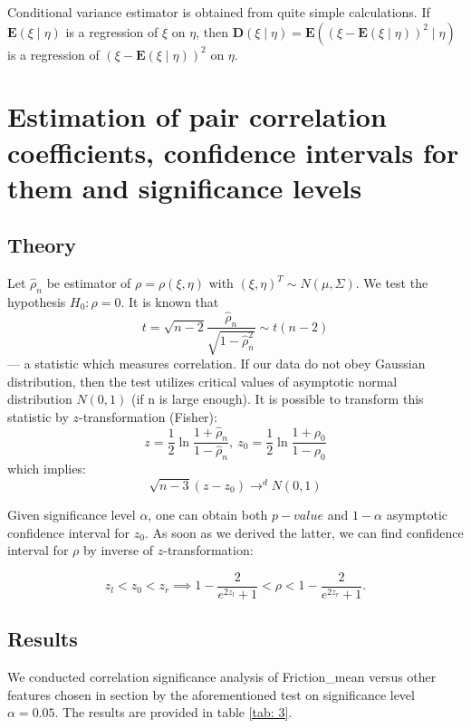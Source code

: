 \documentclass[12pt, bachelor, substylefile = algo_title.rtx]{disser}
\theoremstyle{definition}
\begin{document}
Conditional variance estimator is obtained from quite simple calculations. If $\mathbf{E}(\xi \mid \eta)$ is a regression of $\xi$ on $\eta$, then $\mathbf{D}(\xi \mid \eta) = \mathbf{E}((\xi - \mathbf{E}(\xi \mid \eta))^2 \mid \eta)$ is a regression of $(\xi - \mathbf{E}(\xi \mid \eta))^2$ on $\eta$.

\section{Estimation of pair correlation coefficients, confidence intervals for them and
significance levels}
\subsection{Theory}
Let $\hat{\rho}_n$ be estimator of $\rho = \rho(\xi, \eta)$ with $(\xi, \eta)^T \sim N(\mu, \Sigma)$. We test the hypothesis $H_0: \rho = 0$. It is known that \[ t = \sqrt{n-2}\frac{\hat{\rho}_n}{\sqrt{1-\hat{\rho}^2_n}} \sim t(n-2) \]
--- a statistic which measures correlation. If our data do not obey Gaussian distribution, then the test utilizes critical values of asymptotic normal distribution $N(0, 1)$ (if n is large enough). It is possible to transform this statistic by $z$-transformation (Fisher):
\[ z = \frac{1}{2} \ln \frac{1+\hat\rho_n}{1-\hat\rho_n},\ z_0 = \frac{1}{2} \ln \frac{1+\rho_0}{1-\rho_0} \]
which implies:
$$ \sqrt{n-3}(z-z_0) \to^d N(0, 1) $$

Given significance level $\alpha$, one can obtain both $p-value$ and $1-\alpha$ asymptotic confidence interval for $z_0$. As soon as we derived the latter, we can find confidence interval for $\rho$ by inverse of $z$-transformation:

\[ z_l < z_0 < z_r \implies 1 - \frac{2}{e^{2z_l}+1} < \rho < 1 - \frac{2}{e^{2z_r}+1} .\] 

\subsection{Results}

We conducted correlation significance analysis of Friction\_mean versus other features chosen in section \label{sec: est} by the aforementioned test on significance level $\alpha = 0.05$. The results are provided in table \ref{tab: 3}.
\end{document}
